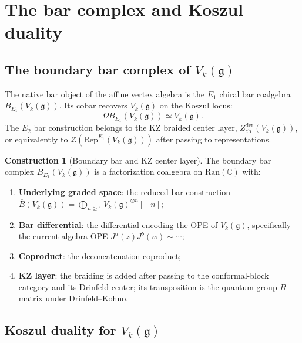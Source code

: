 \documentclass[11pt]{article}
\theoremstyle{definition}
\newtheorem{construction}[theorem]{Construction}
\theoremstyle{remark}
\newcommand{\Rep}{\mathrm{Rep}}
\newcommand{\Ran}{\mathrm{Ran}}
\newcommand{\cZ}{\mathcal{Z}}
\newcommand{\frakg}{\mathfrak{g}}
\begin{document}
\section{The bar complex and Koszul duality}
\label{sec:bar-koszul}

\subsection{The boundary bar complex of $V_k(\frakg)$}
\label{subsec:e2-bar-vk}

The native bar object of the affine vertex algebra is the $E_1$ chiral
bar coalgebra $B_{E_1}(V_k(\frakg))$. Its cobar recovers
$V_k(\frakg)$ on the Koszul locus:
\[
 \Omega B_{E_1}(V_k(\frakg)) \simeq V_k(\frakg).
\]
The $E_2$ bar construction belongs to the KZ braided center layer,
$Z^{\mathrm{der}}_{\mathrm{ch}}(V_k(\frakg))$, or equivalently to
$\cZ(\Rep^{E_1}(V_k(\frakg)))$ after passing to representations.

\begin{construction}[Boundary bar and KZ center layer]
\label{constr:e2-bar-vk}
The boundary bar complex $B_{E_1}(V_k(\frakg))$ is a factorization
coalgebra on $\Ran(\mathbb{C})$ with:
\begin{enumerate}[label=(\roman*)]
 \item \textbf{Underlying graded space}: the reduced bar construction
 $\overline{B}(V_k(\frakg)) = \bigoplus_{n \ge 1} V_k(\frakg)^{\otimes n}[-n]$;
 \item \textbf{Bar differential}: the differential encoding
 the OPE of $V_k(\frakg)$, specifically the current algebra OPE
 $J^a(z) J^b(w) \sim \cdots$;
 \item \textbf{Coproduct}: the deconcatenation coproduct;
 \item \textbf{KZ layer}: the braiding is added after passing to the
 conformal-block category and its Drinfeld center; its transposition is
 the quantum-group $R$-matrix under Drinfeld--Kohno.
\end{enumerate}
\end{construction}

\subsection{Koszul duality for $V_k(\frakg)$}
\label{subsec:koszul-vk}
\end{document}
